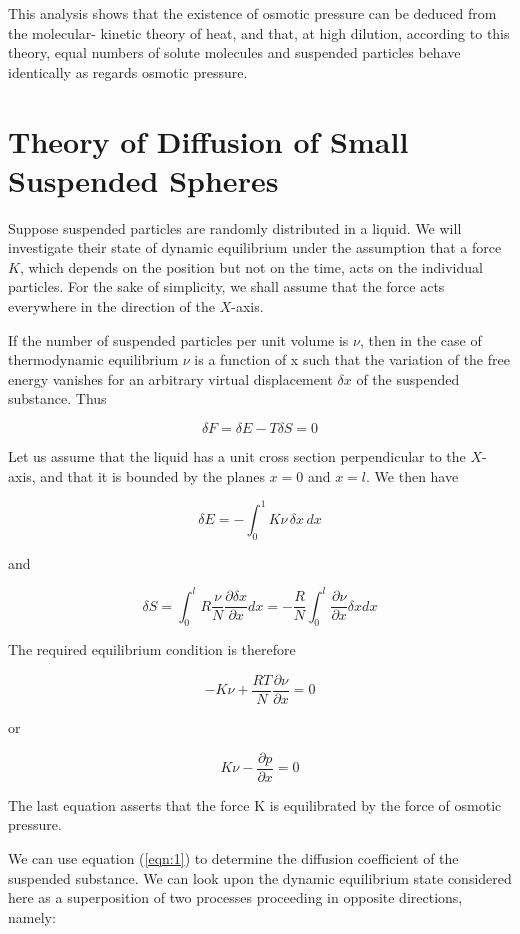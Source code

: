 \documentclass{article}
\begin{document}
This analysis shows that the existence of osmotic pressure can be deduced from the molecular-
kinetic theory of heat, and that, at high dilution, according to this theory, equal numbers of solute
molecules and suspended particles behave identically as regards osmotic pressure.

\section{Theory of Diffusion of Small Suspended Spheres}

Suppose suspended particles are randomly distributed in a liquid. We will investigate their state
of dynamic equilibrium under the assumption that a force $K$, which depends on the position but
not on the time, acts on the individual particles. For the sake of simplicity, we shall assume that
the force acts everywhere in the direction of the $X$-axis.

If the number of suspended particles per unit volume is $\nu$, then in the case of thermodynamic
equilibrium $\nu$ is a function of x such that the variation of the free energy vanishes for an arbitrary
virtual displacement $\delta x$ of the suspended substance. Thus

\[\delta F = \delta E - T\delta S =0\]

Let us assume that the liquid has a unit cross section perpendicular to the $X$-axis, and that it is
bounded by the planes $x=0$ and $x=l$. We then have

\[\delta E= -\int^{1}_{0} K\nu\,\delta x\, dx\]

\clearpage

and

\[\delta S= \int^{l}_{0} R \frac{\nu}{N} \frac{\partial\delta x}{\partial x}dx = - \frac{R}{N}\int^{l}_{0}
\frac{\partial\nu}{\partial x}\delta xdx \]

The required equilibrium condition is therefore

\begin{equation}
\label{eqn:1}
-K\nu + \frac{RT}{N}\frac{\partial\nu}{\partial x} = 0
\end{equation}

or

\[K\nu - \frac{\partial p}{\partial x} = 0 \]

\noindent The last equation asserts that the force K is equilibrated by the force of osmotic pressure.

We can use equation (\ref{eqn:1}) to determine the diffusion coefficient of the suspended substance. We
can look upon the dynamic equilibrium state considered here as a superposition of two processes
proceeding in opposite directions, namely:
\end{document}
